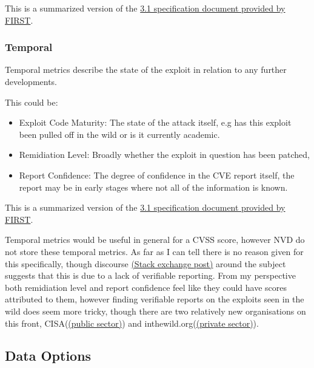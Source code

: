 \documentclass[12pt]{article}
\begin{document}
\footnotesize{This is a summarized version of the
	\href{https://www.first.org/cvss/v3.1/specification-document}{3.1 specification document
		provided by FIRST}.}


\subsubsection*{Temporal}

Temporal metrics describe the state of the exploit in relation to any further developments.

\bigskip

This could be:
\begin{itemize}

	\item Exploit Code Maturity: The state of the attack itself, e.g has this exploit been pulled off in the wild or is it currently academic.

	\item Remidiation Level: Broadly whether the exploit in question has been patched,

	\item Report Confidence: The degree of confidence in the CVE report itself, the report may be in early stages where not all of the
	      information is known.

\end{itemize}

\footnotesize{This is a summarized version of the
	\href{https://www.first.org/cvss/v3.1/specification-document}{3.1 specification document
		provided by FIRST}.}

Temporal metrics would be useful in general for a CVSS score, however NVD do not store these temporal metrics. As far as I can tell there is no reason
given for this specifically, though discourse
\href{https://security.stackexchange.com/questions/270257/cvss-v3-and-v3-1-missing-temporal-metrics-exploit-code-maturity-and-remediation }{(Stack
	exchange post)} around the subject suggests that this is due to a lack of verifiable reporting. From my perspective both remidiation level and report
confidence feel like they could have scores attributed to them, however finding verifiable reports on the exploits seen in the wild does seem more
tricky, though there are two relatively new organisations on this front,
CISA(\href{https://www.cisa.gov/known-exploited-vulnerabilities-catalog}{(public sector)}) and inthewild.org(\href{https://inthewild.io/}{(private
	sector)}).

\subsection{Data Options}
\end{document}

